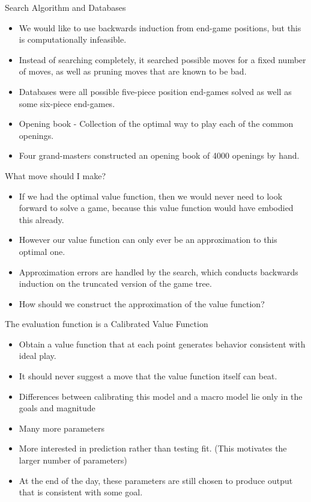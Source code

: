 \documentclass[presentation]{beamer}
\begin{document}
\begin{frame}[label={sec:orgb6efd95}]{Search Algorithm and Databases}
\begin{itemize}
\item We would like to use backwards induction from end-game positions,
but this is computationally infeasible.
\item Instead of searching completely, it searched possible moves for a
fixed number of moves, as well as pruning moves that are known to be
bad.
\item Databases were all possible five-piece position end-games solved as
well as some six-piece end-games.
\item Opening book - Collection of the optimal way to play each of the
common openings.
\item Four grand-masters constructed an opening book of 4000 openings by
hand.
\end{itemize}
\end{frame}

\begin{frame}[label={sec:org90dc927}]{What move should I make?}
\begin{itemize}
\item If we had the optimal value function, then we would never need to
look forward to solve a game, because this value function would have
embodied this already.
\item However our value function can only ever be an approximation to this
optimal one.
\item Approximation errors are handled by the search, which conducts
backwards induction on the truncated version of the game tree.
\item How should we construct the approximation of the value function?
\end{itemize}
\end{frame}


\begin{frame}[label={sec:org8b5474f}]{The evaluation function is a Calibrated Value Function}
\begin{itemize}
\item Obtain a value function that at each point generates behavior
consistent with ideal play.
\item It should never suggest a move that the value function itself can
beat.
\item Differences between calibrating this model and a macro model lie
only in the goals and magnitude
\item Many more parameters
\item More interested in prediction rather than testing fit. (This
motivates the larger number of parameters)
\item At the end of the day, these parameters are still chosen to produce
output that is consistent with some goal.
\end{itemize}
\end{frame}
\end{document}
